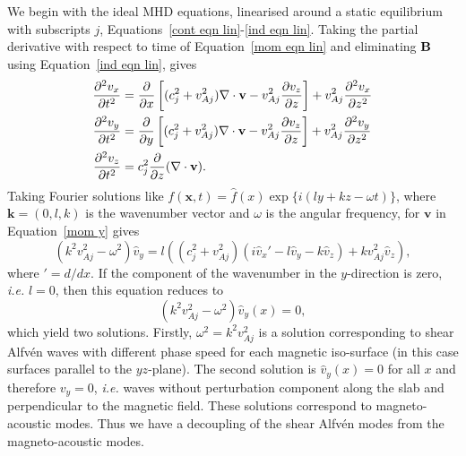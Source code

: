\documentclass[12pt,draft]{../style-files/ociamthesis}
\begin{document}
We begin with the ideal MHD equations, linearised around a static equilibrium with subscripts $j$, Equations~\eqref{cont eqn lin}-\eqref{ind eqn lin}. Taking the partial derivative with respect to time of Equation~\eqref{mom eqn lin} and eliminating $\mathbf{B}$ using Equation~\eqref{ind eqn lin}, gives
\begin{align}
	\frac{\partial^2 v_x}{\partial t^2} &= \frac{\partial}{\partial x}\left[ (c_j^2 + v_{Aj}^2)\nabla\cdot\mathbf{v} - v_{Aj}^2\frac{\partial v_z}{\partial z} \right] + v_{Aj}^2 \frac{\partial^2 v_x}{\partial z^2} \label{mom x} \\
	\frac{\partial^2 v_y}{\partial t^2} &= \frac{\partial}{\partial y}\left[ (c_j^2 + v_{Aj}^2)\nabla\cdot\mathbf{v} - v_{Aj}^2\frac{\partial v_z}{\partial z} \right] + v_{Aj}^2 \frac{\partial^2 v_y}{\partial z^2} \label{mom y} \\
	\frac{\partial^2 v_z}{\partial t^2} &= c_j^2\frac{\partial}{\partial z}(\nabla\cdot\mathbf{v}). \label{mom z}
\end{align}
Taking Fourier solutions like $f(\mathbf{x},t) = \hat{f}(x) \exp\{i(ly + kz - \omega t)\}$, where $\mathbf{k} = (0, l, k)$ is the wavenumber vector and $\omega$ is the angular frequency, for $\mathbf{v}$ in Equation~\eqref{mom y} gives
\begin{equation}
(k^2v_{Aj}^2 - \omega^2)\hat{v}_y = l((c_j^2 + v_{Aj}^2)(i\hat{v}_x' - l\hat{v}_y - k\hat{v}_z) + kv_{Aj}^2\hat{v}_z),
\end{equation}
where $' = d/dx$. If the component of the wavenumber in the $y$-direction is zero, \textit{i.e.} $l = 0$, then this equation reduces to
\begin{equation}
(k^2v_{Aj}^2 - \omega^2)\hat{v}_y(x) = 0,
\end{equation}
which yield two solutions. Firstly, $\omega^2 = k^2v_{Aj}^2$ is a solution corresponding to shear Alfv\'{e}n waves with different phase speed for each magnetic iso-surface (in this case surfaces parallel to the $yz$-plane). The second solution is $\hat{v}_y(x) = 0$ for all $x$ and therefore $v_y = 0$, \textit{i.e.} waves without perturbation component along the slab and perpendicular to the magnetic field. These solutions correspond to magneto-acoustic modes. Thus we have a decoupling of the shear Alfv\'{e}n modes from the magneto-acoustic modes.
\end{document}
